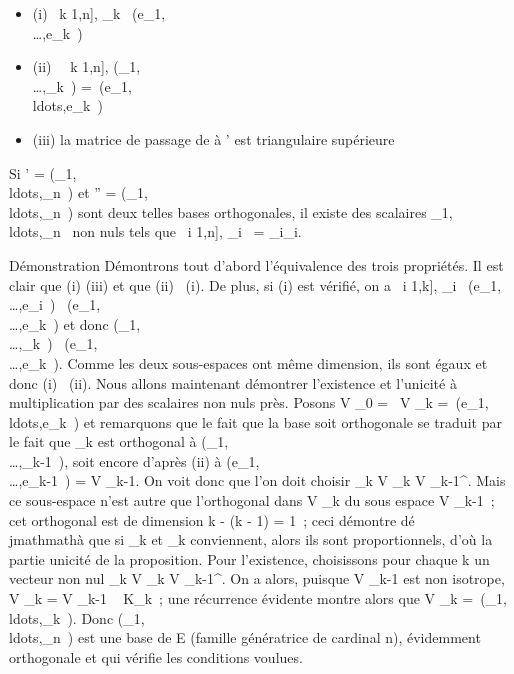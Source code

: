 \documentclass[]{article}
\begin{document}
\begin{itemize}
\itemsep1pt\parskip0pt
\item
  (i) \forall~k \in {[}1,n{]}, \epsilon_k~
  \in\mathrmVect(e_1,\\\ldots,e_k~)
\item
  (ii) \forall~~k \in {[}1,n{]},
  \mathrmVect(\epsilon_1,\\\ldots,\epsilon_k~)
  =\
  \mathrmVect(e_1,\\ldots,e_k~)
\item
  (iii) la matrice de passage de  à ' est triangulaire supérieure
\end{itemize}

Si ' =
(\epsilon_1,\\ldots,\epsilon_n~)
et \mathcal{E}'' =
(\eta_1,\\ldots,\eta_n~)
sont deux telles bases orthogonales, il existe des scalaires
\lambda_1,\\ldots,\lambda_n~
non nuls tels que \forall~i \in {[}1,n{]}, \eta_i~
= \lambda_i\epsilon_i.

Démonstration Démontrons tout d'abord l'équivalence des trois
propriétés. Il est clair que (i) \Leftrightarrow (iii) et
que (ii) \rigtharrow~(i). De plus, si (i) est vérifié, on a
\forall~i \in {[}1,k{]}, \epsilon_i~
\in\mathrmVect(e_1,\\\ldots,e_i~)
\subset~\mathrmVect(e_1,\\\ldots,e_k~)
et donc
\mathrmVect(\epsilon_1,\\\ldots,\epsilon_k~)
\subset~\mathrmVect(e_1,\\\ldots,e_k~).
Comme les deux sous-espaces ont même dimension, ils sont égaux et donc
(i) \rigtharrow~(ii). Nous allons maintenant démontrer l'existence et l'unicité à
multiplication par des scalaires non nuls près. Posons V _0 =
\0\, V _k
=\
\mathrmVect(e_1,\\ldots,e_k~)
et remarquons que le fait que la base soit orthogonale se traduit par le
fait que \epsilon_k est orthogonal à
\mathrmVect(\epsilon_1,\\\ldots,\epsilon_k-1~),
soit encore d'après (ii) à
\mathrmVect(e_1,\\\ldots,e_k-1~)
= V _k-1. On voit donc que l'on doit choisir \epsilon_k \in V
_k \bigcap V _k-1^\bot. Mais ce sous-espace n'est autre
que l'orthogonal dans V _k du sous espace V _k-1~; cet
orthogonal est de dimension k - (k - 1) = 1~; ceci démontre dé\\jmathmathà que si
\epsilon_k et \eta_k conviennent, alors ils sont proportionnels,
d'où la partie unicité de la proposition. Pour l'existence, choisissons
pour chaque k un vecteur non nul \epsilon_k \in V _k \bigcap V
_k-1^\bot. On a alors, puisque V _k-1 est non
isotrope, V _k = V _k-1 \oplus~ K\epsilon_k~; une
récurrence évidente montre alors que V _k
=\
\mathrmVect(\epsilon_1,\\ldots,\epsilon_k~).
Donc
(\epsilon_1,\\ldots,\epsilon_n~)
est une base de E (famille génératrice de cardinal n), évidemment
orthogonale et qui vérifie les conditions voulues.
\end{document}
